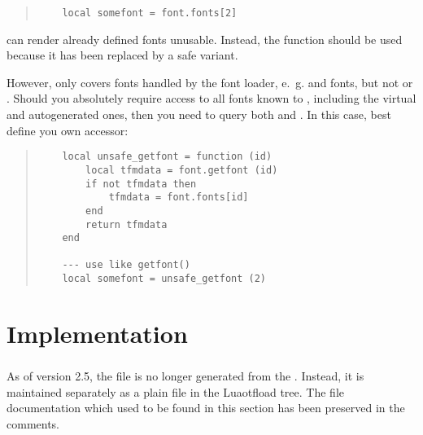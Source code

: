 \begin{quote}
  \begin{verbatim}
    local somefont = font.fonts[2]
  \end{verbatim}
\end{quote}

\noindent can render already defined fonts unusable.
%
Instead, the function  should be used
because it has been replaced by a safe variant.

However,  only covers fonts handled by the
font loader, e.~g.  and 
fonts, but not  or .
%
Should you absolutely require access to all fonts known to \LUATEX,
including the virtual and autogenerated ones, then you need to query
both  and .
%
In this case, best define you own accessor:

\begin{quote}
  \begin{verbatim}
    local unsafe_getfont = function (id)
        local tfmdata = font.getfont (id)
        if not tfmdata then
            tfmdata = font.fonts[id]
        end
        return tfmdata
    end

    --- use like getfont()
    local somefont = unsafe_getfont (2)
  \end{verbatim}
\end{quote}

\part{Implementation}

\section {}

As of version 2.5, the file  is no longer
generated from the .
%
Instead, it is maintained separately as a plain  file
 in the Luaotfload  tree.
%
The file documentation which used to be found in this section has been
preserved in the comments.

\section{}

